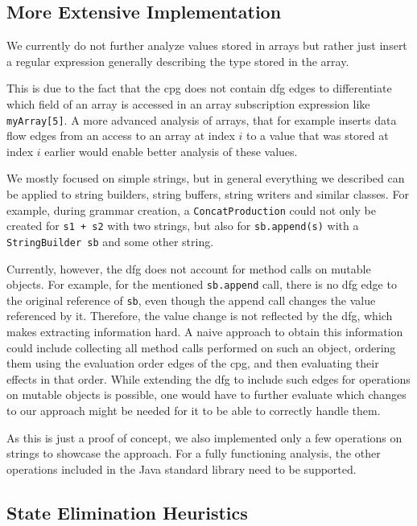 \subsection{More Extensive Implementation}

We currently do not further analyze values stored in arrays but rather just insert a regular expression generally describing the type stored in the array.

This is due to the fact that the \ac{cpg} does not contain \ac{dfg} edges to differentiate which field of an array is accessed in an array subscription expression like \lstinline|myArray[5]|.
A more advanced analysis of arrays, that for example inserts data flow edges from an access to an array at index $i$ to a value that was stored at index $i$ earlier would enable better analysis of these values.

We mostly focused on simple strings, but in general everything we described can be applied to string builders, string buffers, string writers and similar classes. For example, during grammar creation, a \lstinline|ConcatProduction| could not only be created for \lstinline|s1 + s2| with two strings, but also for \lstinline|sb.append(s)| with a \lstinline|StringBuilder sb| and some other string. 

Currently, however, the \ac{dfg} does not account for method calls on mutable objects. For example, for the mentioned \lstinline|sb.append| call, there is no \ac{dfg} edge to the original reference of \lstinline|sb|, even though the append call changes the value referenced by it. Therefore, the value change is not reflected by the \ac{dfg}, which makes extracting information hard. A naive approach to obtain this information could include collecting all method calls performed on such an object, ordering them using the evaluation order edges of the \ac{cpg}, and then evaluating their effects in that order. While extending the \ac{dfg} to include such edges for operations on mutable objects is possible, one would have to further evaluate which changes to our approach might be needed for it to be able to correctly handle them.

As this is just a proof of concept, we also implemented only a few operations on strings to showcase the approach. For a fully functioning analysis, the other operations included in the Java standard library need to be supported.

\subsection{State Elimination Heuristics}

